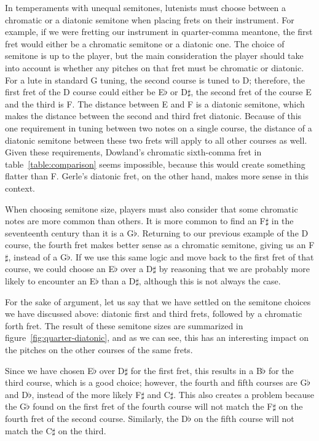 In temperaments with unequal semitones, lutenists must choose between a chromatic or a diatonic semitone when placing
frets on their instrument. For example, if we were fretting our instrument in quarter-comma meantone, the first fret
would either be a chromatic semitone or a diatonic one. The choice of semitone is up to the player, but the main
consideration the player should take into account is whether any pitches on that fret must be chromatic or diatonic.
For a lute in standard G tuning, the second course is tuned to D; therefore, the first fret of the D course could either
be E$\flat$ or D$\sharp$, the second fret of the course E and the third is F. The distance between E and F is a
diatonic semitone, which makes the distance between the second and third fret diatonic. Because of this one requirement
in tuning between two notes on a single course, the distance of a diatonic semitone between these two frets will apply
to all other courses as well. Given these requirements, Dowland's chromatic sixth-comma fret in
table~\ref{table:comparison} seems impossible, because this would create something flatter than F. Gerle's diatonic
fret, on the other hand, makes more sense in this context.

When choosing semitone size, players must also consider that some chromatic notes are more common than others. It is
more common to find an F$\sharp$ in the seventeenth century than it is a G$\flat$. Returning to our previous example of
the D course, the fourth fret makes better sense as a chromatic semitone, giving us an F$\sharp$, instead of a G$\flat$.
If we use this same logic and move back to the first fret of that course, we could choose an E$\flat$ over a D$\sharp$
by reasoning that we are probably more likely to encounter an E$\flat$ than a D$\sharp$, although this is not always the
case.

For the sake of argument, let us say that we have settled on the semitone choices we have
discussed above: diatonic first and third frets, followed by a chromatic forth fret. The
result of these semitone sizes are summarized in figure~\ref{fig:quarter-diatonic}, and as
we can see, this has an interesting impact on the pitches on the other courses
of the same frets.

Since we have chosen E$\flat$ over D$\sharp$ for the first fret, this results in a
B$\flat$ for the third course, which is a good choice; however, the fourth and fifth
courses are G$\flat$ and D$\flat$, instead of the more likely F$\sharp$ and C$\sharp$.
This also creates a problem because the G$\flat$ found on the first fret of the fourth
course will not match the F$\sharp$ on the fourth fret of the second course. Similarly,
the D$\flat$ on the fifth course will not match the C$\sharp$ on the third.

